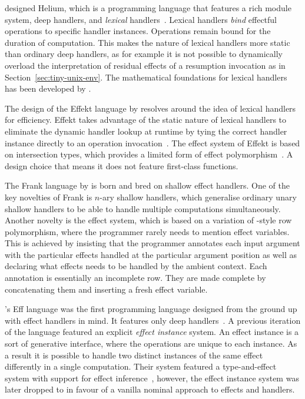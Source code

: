 \documentclass[12pt,phd,lfcs,twoside,openright,logo,leftchapter,normalheadings]{infthesis}
\theoremstyle{plain}
\theoremstyle{definition}
\begin{document}
\citet{BiernackiPPS18} designed Helium, which is a programming
language that features a rich module system, deep handlers, and
\emph{lexical} handlers~\cite{BiernackiPPS20}. Lexical handlers
\emph{bind} effectful operations to specific handler
instances. Operations remain bound for the duration of
computation. This makes the nature of lexical handlers more static
than ordinary deep handlers, as for example it is not possible to
dynamically overload the interpretation of residual effects of a
resumption invocation as in Section~\ref{sec:tiny-unix-env}.
%
The mathematical foundations for lexical handlers has been developed
by \citet{Geron19}.

The design of the Effekt language by \citet{BrachthauserSO20b}
resolves around the idea of lexical handlers for efficiency. Effekt
takes advantage of the static nature of lexical handlers to eliminate
the dynamic handler lookup at runtime by tying the correct handler
instance directly to an operation
invocation~\cite{BrachthauserS17,SchusterBO20}. The effect system of
Effekt is based on intersection types, which provides a limited form
of effect polymorphism~\cite{BrachthauserSO20b}. A design choice that
means it does not feature first-class functions.

The Frank language by \citet{LindleyMM17} is born and bred on shallow
effect handlers. One of the key novelties of Frank is $n$-ary shallow
handlers, which generalise ordinary unary shallow handlers to be able
to handle multiple computations simultaneously. Another novelty is the
effect system, which is based on a variation of
\citeauthor{Leijen05}-style row polymorphism, where the programmer
rarely needs to mention effect variables. This is achieved by
insisting that the programmer annotates each input argument with the
particular effects handled at the particular argument position as well
as declaring what effects needs to be handled by the ambient
context. Each annotation is essentially an incomplete row. They are
made complete by concatenating them and inserting a fresh effect
variable.

\citeauthor{BauerP15}'s Eff language was the first programming
language designed from the ground up with effect handlers in mind. It
features only deep handlers~\cite{BauerP15}. A previous iteration of
the language featured an explicit \emph{effect instance} system. An
effect instance is a sort of generative interface, where the
operations are unique to each instance. As a result it is possible to
handle two distinct instances of the same effect differently in a
single computation. Their system featured a type-and-effect system
with support for effect inference~\cite{Pretnar13,BauerP13}, however,
the effect instance system was later dropped to in favour of a vanilla
nominal approach to effects and handlers.
\end{document}

